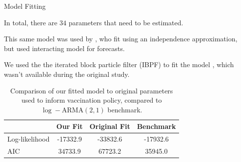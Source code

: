 \documentclass[aspectratio=169]{beamer}\usepackage[]{graphicx}\usepackage[]{xcolor}
\begin{document}

\begin{frame}{Model Fitting}

In total, there are $34$ parameters that need to be estimated.

This same model was used by \citet[Group~3 of][]{lee20}, who fit using an independence approximation, but used interacting model for forecasts.

We used the the iterated block particle filter (IBPF) to fit the model \citep{ionides24}, which wasn't available during the original study.

\begin{table}[ht]
\centering
\begin{tabular}{|l|c|c|c|}
\hline
 & \textbf{Our Fit} & \textbf{Original Fit} & \textbf{Benchmark} \\
\hline
Log-likelihood & \cellcolor{green!20}-17332.9 & \cellcolor{red!20}-33832.6 & -17932.6 \\
\hline
AIC & \cellcolor{green!20}34733.9 & \cellcolor{red!20}67723.2 & 35945.0 \\
\hline
\end{tabular}
\caption{Comparison of our fitted model to original parameters used to inform vaccination policy, compared to $\log-\mathrm{ARMA}(2, 1)$ benchmark.}
\label{tab:fit_comparison}
\end{table}

\end{frame}
\end{document}
